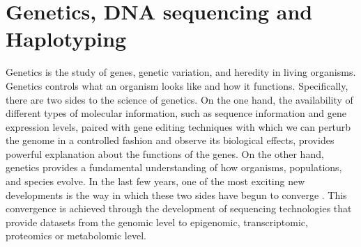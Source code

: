 \section{Genetics, DNA sequencing and Haplotyping}\label{sec:dna_seq}
Genetics is the study of genes, genetic variation, and heredity in living organisms. 
Genetics controls what an organism looks like and how it functions.
Specifically, there are two sides to the science of genetics.
On the one hand, the availability of different types of molecular information, such as sequence information and gene expression levels, paired with gene editing techniques with which we can perturb the genome in a controlled fashion and observe its biological effects, 
provides powerful explanation about the functions of the genes.
On the other hand, genetics provides a fundamental understanding of how organisms, populations, and species evolve. 
In the last few years, one of the most exciting new developments is the way in which these two sides have begun to converge \citep{casillas2017molecular}.
This convergence is achieved through the development of sequencing technologies that provide datasets from the genomic level to epigenomic, transcriptomic, proteomics or metabolomic level.


